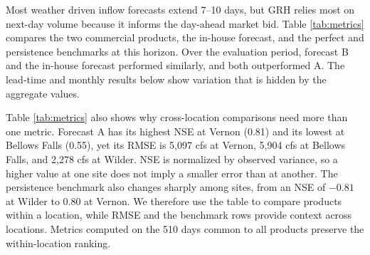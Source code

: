\documentclass[MLA]{USG} %
\begin{document}
Most weather driven inflow forecasts extend 7--10 days, but GRH relies most on next-day volume because it informs the day-ahead market bid. Table \ref{tab:metrics} compares the two commercial products, the in-house forecast, and the perfect and persistence benchmarks at this horizon. Over the evaluation period, forecast B and the in-house forecast performed similarly, and both outperformed A. The lead-time and monthly results below show variation that is hidden by the aggregate values.

Table \ref{tab:metrics} also shows why cross-location comparisons need more than one metric. Forecast A has its highest NSE at Vernon (0.81) and its lowest at Bellows Falls (0.55), yet its RMSE is 5,097 cfs at Vernon, 5,904 cfs at Bellows Falls, and 2,278 cfs at Wilder. NSE is normalized by observed variance, so a higher value at one site does not imply a smaller error than at another. The persistence benchmark also changes sharply among sites, from an NSE of $-0.81$ at Wilder to 0.80 at Vernon. We therefore use the table to compare products within a location, while RMSE and the benchmark rows provide context across locations. Metrics computed on the 510 days common to all products preserve the within-location ranking.
\end{document}
